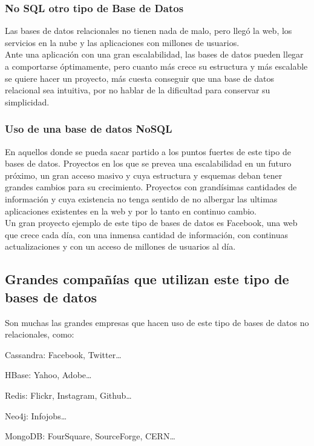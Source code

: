 \documentclass[preprint,12pt]{elsarticle}
\begin{document}

\subsubsection{\textbf{No SQL otro tipo de Base de Datos}}

Las bases de datos relacionales no tienen nada de malo, pero llegó la web, los servicios en la nube y las aplicaciones con millones de usuarios.
\\
Ante una aplicación con una gran escalabilidad,  las bases de datos pueden llegar a comportarse óptimamente, pero cuanto más crece su estructura y más escalable se quiere hacer un proyecto, más cuesta conseguir que una base de datos relacional sea intuitiva, por no hablar de la dificultad para conservar su simplicidad.

\subsubsection{\textbf{Uso de una base de datos NoSQL}}

En aquellos donde se pueda sacar partido a los puntos fuertes de este tipo de bases de datos. Proyectos en los que se prevea una escalabilidad en un futuro próximo, un gran acceso masivo y cuya estructura y esquemas deban tener grandes cambios para su crecimiento. Proyectos con grandísimas cantidades de información y cuya existencia no tenga sentido de no albergar las ultimas aplicaciones existentes en la web y por lo tanto en continuo cambio.
\\
Un gran proyecto ejemplo de este tipo de bases de datos es Facebook, una web que crece cada día, con una inmensa cantidad de información, con continuas actualizaciones y con un acceso de millones de usuarios al día.



\subsection{\textbf{Grandes compañías que utilizan este tipo de bases de datos}}
Son muchas las grandes empresas que hacen uso de este tipo de bases de datos no relacionales, como:
\item Cassandra: Facebook, Twitter…
\item HBase: Yahoo, Adobe…
\item Redis: Flickr, Instagram, Github…
\item Neo4j: Infojobs…
\item MongoDB: FourSquare, SourceForge, CERN… 
\end{document}
